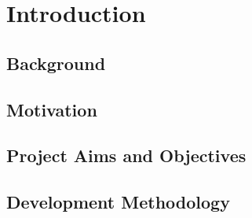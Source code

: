 \chapter{Introduction}

\section{Background}

\section{Motivation}

\section{Project Aims and Objectives}

\section{Development Methodology}

